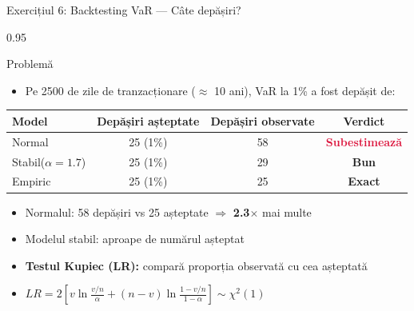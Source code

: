 \documentclass[9pt, aspectratio=169, t]{beamer}
\begin{document}
\begin{frame}{Exercițiul 6: Backtesting VaR --- Câte depășiri?}
    \begin{cminipage}{0.95\textwidth}
\begin{block}{Problemă}
\begin{itemize}\setlength{\itemsep}{0pt}
    \item Pe 2500 de zile de tranzacționare ($\approx$ 10 ani), VaR la 1\% a fost depășit de:
\end{itemize}
\end{block}

\vspace{0.1cm}
\renewcommand{\arraystretch}{1.3}
\begin{center}
\begin{tabular}{lccc}
\toprule
\textbf{Model} & \textbf{Depășiri așteptate} & \textbf{Depășiri observate} & \textbf{Verdict} \\
\midrule
Normal & 25 (1\%) & 58 & \textcolor{Crimson}{\textbf{Subestimează}} \\
Stabil($\alpha = 1.7$) & 25 (1\%) & 29 & \textcolor{Forest}{\textbf{Bun}} \\
Empiric & 25 (1\%) & 25 & \textcolor{Forest}{\textbf{Exact}} \\
\bottomrule
\end{tabular}
\end{center}

\begin{itemize}\setlength{\itemsep}{0pt}
    \item Normalul: 58 depășiri vs 25 așteptate $\Rightarrow$ \textbf{2.3$\times$} mai multe
    \item Modelul stabil: aproape de numărul așteptat
    \item \textbf{Testul Kupiec (LR):} compară proporția observată cu cea așteptată
    \item $LR = 2\left[v\ln\frac{v/n}{\alpha} + (n-v)\ln\frac{1-v/n}{1-\alpha}\right] \sim \chi^2(1)$
\end{itemize}
    \end{cminipage}
\end{frame}
\end{document}
